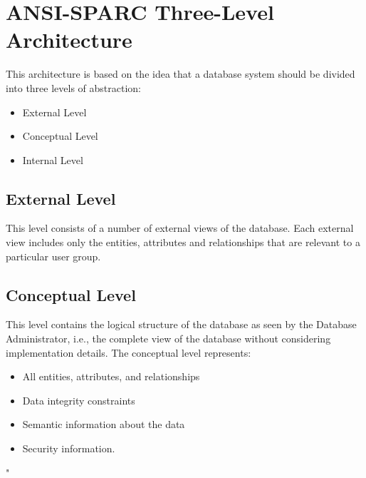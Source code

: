 \documentclass[12pt letter]{report}
\begin{document}
\section{ANSI-SPARC Three-Level Architecture}


This architecture is based on the idea that a database system should be divided into three levels of abstraction:
\begin{itemize}
  \item External Level
  \item Conceptual Level
  \item Internal Level
\end{itemize}

\subsection{External Level}


This level consists of a number of external views of the database. Each external view includes only the entities,
attributes and relationships that are relevant to a particular user group.

\subsection{Conceptual Level}


This level contains the logical structure of the database as seen by the Database Administrator, i.e., the complete view
of the database without considering implementation details. The conceptual level represents:
\begin{itemize}
  \item All entities, attributes, and relationships
  \item Data integrity constraints
  \item Semantic information about the data
  \item Security information.
\end{itemize}
"
\end{document}
